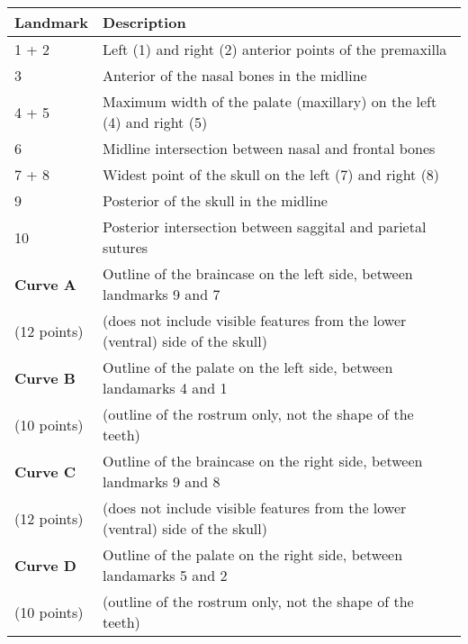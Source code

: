 
\begin{tabular}[t]{p{2.0cm} p{13cm}}		
\hline
\textbf{Landmark} & \textbf{Description} \\
\hline
1 + 2 & Left (1) and right (2) anterior points of the premaxilla \\
3 & Anterior of the nasal bones in the midline \\
4 + 5 &	Maximum width of the palate (maxillary) on the left (4) and right (5)\\
6 & Midline intersection between nasal and frontal bones \\
7 + 8 & Widest point of the skull on the left (7) and right (8) \\
9 &	Posterior of the skull in the midline \\
10 & Posterior intersection between saggital and parietal sutures \\
\hline
\textbf{Curve A} & Outline of the braincase on the left side, between landmarks 9 and 7\\ 
(12 points) & (does not include visible features from the lower (ventral) side of the skull) \\

\textbf{Curve B} & Outline of the palate on the left side, between landamarks 4 and 1 \\
(10 points) & (outline of the rostrum only, not the shape of the teeth)\\

\textbf{Curve C} &	Outline of the braincase on the right side, between landmarks 9 and 8 \\
(12 points) & (does not include visible features from the lower (ventral) side of the skull) \\

\textbf{Curve D} & Outline of the palate on the right side, between landamarks 5 and 2 \\
(10 points) & (outline of the rostrum only, not the shape of the teeth)\\
\hline
\end{tabular}